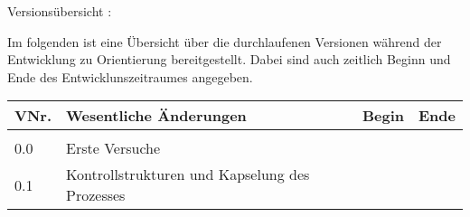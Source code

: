 Versionsübersicht : 

Im folgenden ist eine Übersicht über die durchlaufenen Versionen während der Entwicklung zu Orientierung bereitgestellt.
Dabei sind auch zeitlich Beginn und Ende des Entwicklunszeitraumes angegeben.

\begin{tabular}{l l l l}
	VNr. & Wesentliche Änderungen & Begin & Ende \\
	\hline\\
	0.0 & Erste Versuche & & \\
	0.1 & Kontrollstrukturen und Kapselung des Prozesses & & \\
\end{tabular}

